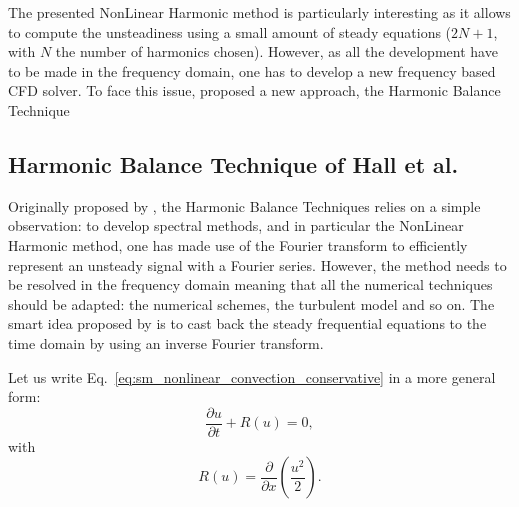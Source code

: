The presented NonLinear Harmonic method is particularly interesting
as it allows to compute the unsteadiness using a small amount 
of steady equations ($2N + 1$, with $N$ the number of harmonics chosen).
However, as all the development have to be made in the frequency domain,
one has to develop a new frequency based CFD solver. To face this issue,
\citet{Hall2002} proposed a new approach, the Harmonic Balance Technique


\subsection{Harmonic Balance Technique of Hall et al.} %
\label{sub:harmonic_balance_technique_of_hall}

Originally proposed by \citet{Hall2002}, the Harmonic Balance Techniques
relies on a simple observation: to develop spectral methods, and in
particular the NonLinear Harmonic method, one has made use of the Fourier
transform to efficiently represent an unsteady signal with a Fourier series.
However, the method needs to be resolved in the frequency domain meaning
that all the numerical techniques should be adapted: the numerical schemes,
the turbulent model and so on. The smart idea 
proposed by \citet{Hall2002} is to
cast back the steady frequential equations to the time domain
by using an inverse Fourier transform.

Let us write Eq.~\ref{eq:sm_nonlinear_convection_conservative} 
in a more general form:
\begin{equation}
	\frac{\partial u}{\partial t} + R (u) = 0,
	\label{eq:sm_nonlinear_convection_residual}
\end{equation}
with
\begin{equation}
	R(u) = \frac{\partial}{\partial x} \left( 
	\frac{u^2}{2} \right).
\end{equation}


